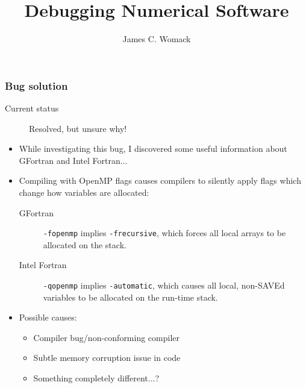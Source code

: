 \documentclass{beamer}
\title{Debugging Numerical Software}
\author{James C. Womack}
\begin{document}
\begin{frame}
  \frametitle{Bug solution}
  \begin{description}
    \item[Current status] Resolved, but unsure why!
  \end{description}
  {\footnotesize
  \begin{itemize}
    \item While investigating this bug, I discovered some useful information about GFortran and Intel Fortran...
    \item Compiling with OpenMP flags causes compilers to silently apply flags which change how variables are allocated:
    \begin{description}
      \item[GFortran] \texttt{-fopenmp} implies \texttt{-frecursive}, which forces all local arrays to be allocated on the stack.
      \item[Intel Fortran] \texttt{-qopenmp} implies \texttt{-automatic}, which causes all local, non-SAVEd variables to be allocated on the run-time stack.
    \end{description}
    \item Possible causes:
    \begin{itemize} 
      \item Compiler bug/non-conforming compiler
      \item Subtle memory corruption issue in code
      \item Something completely different...?
    \end{itemize}
  \end{itemize}
  }

\end{frame}
\end{document}
